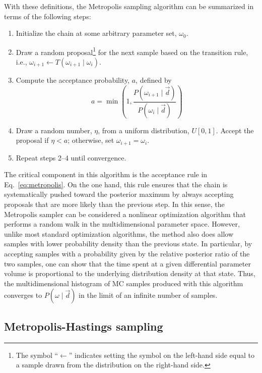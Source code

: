 \documentclass[onecolumn]{aa}
\renewcommand{\d}[0]{\vec{d}}
\begin{document}
With these definitions, the Metropolis sampling algorithm can be
summarized in terms of the following steps:
\begin{enumerate}
  \item Initialize the chain at some arbitrary parameter set,
    $\omega_0$.
  \item Draw a random proposal\footnote{The symbol ``$\leftarrow$''
    indicates setting the symbol on the left-hand side equal to a
    sample drawn from the distribution on the right-hand side.} for the next
    sample based on the transition rule, i.e., $\omega_{i+1}
    \leftarrow T(\omega_{i+1}\mid \omega_i)$.
  \item Compute the acceptance probability, $a$, defined by
    \begin{equation}
      a = \min\left(1,
      \frac{P(\omega_{i+1}\mid \d)}{P(\omega_i\mid \d)}\right)
      \label{eq:metropolis}
    \end{equation}
  \item Draw a random number, $\eta$, from a uniform distribution,
    $U[0,1]$. Accept the proposal if $\eta < a$; otherwise, set
        ${\omega_{i+1} = \omega_i}$.
  \item Repeat steps 2--4 until convergence.
\end{enumerate}

The critical component in this algorithm is the acceptance rule in
Eq.~\eqref{eq:metropolis}. On the one hand, this rule ensures that the
chain is systematically pushed toward the posterior maximum by always
accepting proposals that are more likely than the previous step. In
this sense, the Metropolis sampler can be considered a nonlinear
optimization algorithm that performs a random walk in the
multidimensional parameter space. However, unlike most standard
optimization algorithms, the method also does allow samples with lower
probability density than the previous state. In particular, by
accepting samples with a probability given by the relative posterior
ratio of the two samples, one can show that the time spent at a
given differential parameter volume is proportional to the underlying distribution
density at that state. Thus, the multidimensional histogram of MC
samples produced with this algorithm converges to $P(\omega\mid \d)$ in
the limit of an infinite number of samples.

\subsection{Metropolis-Hastings sampling}
\end{document}
